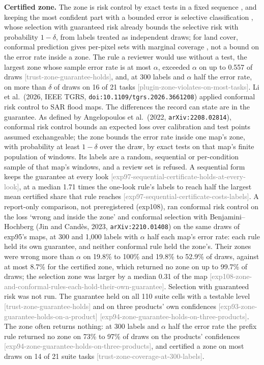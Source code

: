 \documentclass[11pt,a4paper]{article}
\newcommand{\claim}[1]{{\scriptsize\textsf{\textcolor{gray}{[#1]}}}}
\begin{document}
\textbf{Certified zone.} The zone is risk control by exact tests in a fixed sequence \citep{bates2021,angelopoulos2021},
and keeping the most confident part with a bounded error is selective classification \citep{geifman2017}, whose
selection with guaranteed risk already bounds the selective risk with probability $1-\delta$, from labels treated as
independent draws; for land cover, conformal prediction gives per-pixel sets with marginal coverage
\citep{valle2023}, not a bound on the error rate inside a zone. The rule a reviewer would use without a test, the largest zone whose sample error rate is at most
$\alpha$, exceeded $\alpha$ on up to 0.557 of draws \claim{trust-zone-guarantee-holds}, and, at 300 labels and $\alpha$
half the error rate, on more than $\delta$ of draws on 16 of 21 tasks \claim{plugin-zone-violates-on-most-tasks}. Li et
al.\ (2026, IEEE TGRS, \nolinkurl{doi:10.1109/tgrs.2026.3661208}) applied conformal risk control to SAR flood maps. The
differences the record can state are in the guarantee. As defined by Angelopoulos et al.\ (2022,
\nolinkurl{arXiv:2208.02814}), conformal risk control bounds an expected loss over calibration and test points assumed
exchangeable; the zone bounds the error rate inside one map's zone, with probability at least $1-\delta$ over the draw,
by exact tests on that map's finite population of windows. Its labels are a random, sequential or per-condition sample
of that map's windows, and a review set is refused. A sequential form keeps the guarantee at every look
\claim{exp97-sequential-certificate-holds-at-every-look}, at a median 1.71 times the one-look rule's labels to reach
half the largest mean certified share that rule reaches \claim{exp97-sequential-certificate-costs-labels}. A
report-only comparison, not preregistered (exp108), ran conformal risk control on the loss `wrong and inside the zone'
and conformal selection with Benjamini--Hochberg (Jin and Cand\`es, 2023, \nolinkurl{arXiv:2210.01408}) on the same
draws of exp95's maps, at 300 and 1,000 labels with $\alpha$ half each map's error rate: each rule held its own guarantee,
and neither conformal rule held the zone's. Their zones were wrong more than $\alpha$ on 19.8\% to 100\% and 19.8\% to
52.9\% of draws, against at most 8.7\% for the certified zone, which returned no zone on up to 99.7\% of draws; the
selection zone was larger by a median 0.31 of the map
\claim{exp108-zone-and-conformal-rules-each-hold-their-own-guarantee}. Selection with guaranteed risk was not run. The guarantee held on all 110 suite cells with a testable level \claim{trust-zone-guarantee-holds}
and on three products' own confidences \claim{exp93-zone-guarantee-holds-on-a-product}
\claim{exp94-zone-guarantee-holds-on-three-products}. The zone often returns nothing: at 300 labels and $\alpha$ half
the error rate the prefix rule returned no zone on 73\% to 97\% of draws on the products' confidences
\claim{exp94-zone-guarantee-holds-on-three-products}, and certified a zone on most draws on 14 of 21 suite tasks
\claim{trust-zone-coverage-at-300-labels}.
\end{document}

